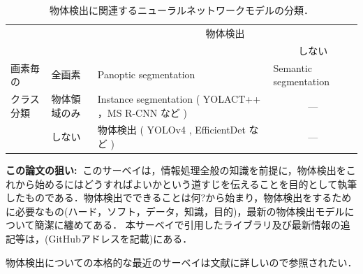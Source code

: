 \documentclass[originalpaper,fleqn]{jsaiart}     %
\begin{document}
\begin{table}
    \caption{物体検出に関連するニューラルネットワークモデルの分類．}
    \label{tbl-select-l}
    \begin{center}
        \setlength{\doublerulesep}{0.5pt}
        \begin{tabularx}{\linewidth}{|p{1.7cm}|p{1.0cm}||X|p{3.3cm}|} \hline
            \multicolumn{2}{|c||}{} & \multicolumn{2}{c|}{物体検出} \\ \cline{3-4}
            \multicolumn{2}{|l||}{} & \centering{する} & \multicolumn{1}{c|}{しない} \\ \hline\hline
            画素毎の & 全画素 & Panoptic segmentation \cite{KHGRD19} & Semantic segmentation \\ \cline{2-4}
            クラス分類 & 物体領域のみ  & Instance segmentation ( YOLACT++ \cite{BZXL20}，MS R-CNN \cite{HHGHW19} など ) &  \multicolumn{1}{c|}{---} \\ \cline{2-4}
            & しない & 物体検出 ( YOLOv4 \cite{BWL20}, EfficientDet \cite{TPL20} など ) & \multicolumn{1}{c|}{---} \\ 
            \hline
        \end{tabularx}
    \end{center}
\end{table}



{\bf この論文の狙い:\ }このサーベイは，情報処理全般の知識を前提に，物体検出をこれから始めるにはどうすればよいかという道すじを伝えることを目的として執筆したものである．物体検出でできることは何?から始まり，物体検出をするために必要なもの(ハード，ソフト，データ，知識，目的)，最新の物体検出モデルについて簡潔に纏めてある．
本サーベイで引用したライブラリ及び最新情報の追記等は，(GitHubアドレスを記載)にある．

物体検出についての本格的な最近のサーベイは文献\cite{JZLYLFQ19}に詳しいので参照されたい．
\end{document}
